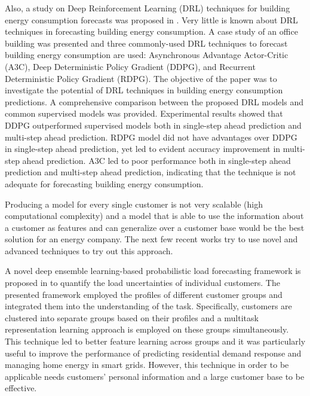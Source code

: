 Also, a study on Deep Reinforcement Learning (DRL) techniques for building energy consumption forecasts was proposed in \cite{LIU2020109675}.
Very little is known about DRL techniques in forecasting building energy consumption.
A case study of an office building was presented and three commonly-used DRL techniques to forecast building energy consumption are used: Asynchronous Advantage Actor-Critic (A3C), Deep Deterministic Policy Gradient (DDPG), and Recurrent Deterministic Policy Gradient (RDPG).
The objective of the paper was to investigate the potential of DRL techniques in building energy consumption predictions.
A comprehensive comparison between the proposed DRL models and common supervised models was provided.
Experimental results showed that DDPG outperformed supervised models both in single-step ahead prediction and multi-step ahead prediction.
RDPG model did not have advantages over DDPG in single-step ahead prediction, yet led to evident accuracy improvement in multi-step ahead prediction.
A3C led to poor performance both in single-step ahead prediction and multi-step ahead prediction, indicating that the technique is not adequate for forecasting building energy consumption.

Producing a model for every single customer is not very scalable (high computational complexity) and a model that is able to use the information about a customer as features and can generalize over a customer base would be the best solution for an energy company.
The next few recent works try to use novel and advanced techniques to try out this approach.

A novel deep ensemble learning-based probabilistic load forecasting framework is proposed in \cite{YANG2019116324} to quantify the load uncertainties of individual customers.
The presented framework employed the profiles of different customer groups and integrated them into the understanding of the task.
Specifically, customers are clustered into separate groups based on their profiles and a multitask representation learning approach is employed on these groups simultaneously.
This technique led to better feature learning across groups and it was particularly useful to improve the performance of predicting residential demand response and managing home energy in smart grids.
However, this technique in order to be applicable needs customers’ personal information and a large customer base to be effective.

